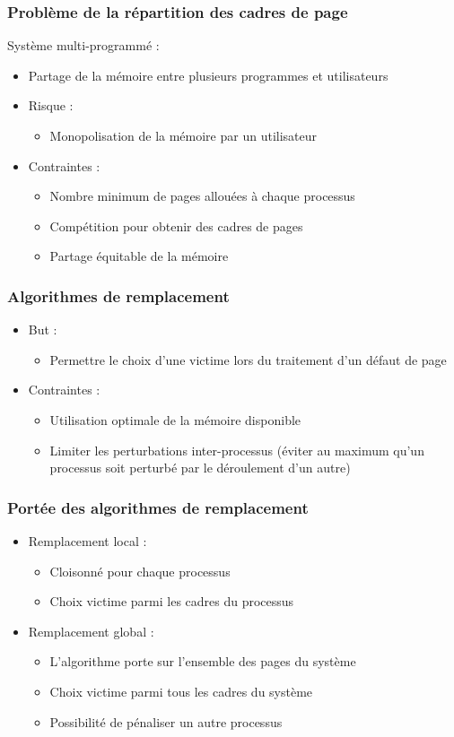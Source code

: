 \begin{frame}
\frametitle{Problème de la répartition des cadres de page}
Système multi-programmé :
\begin{itemize}
\item Partage de la mémoire entre plusieurs programmes et utilisateurs
\item Risque :
\begin{itemize}
\item Monopolisation de la mémoire par un utilisateur
\end{itemize}
\item Contraintes :
\begin{itemize}
\item Nombre minimum de pages allouées à chaque processus
\item Compétition pour obtenir des cadres de pages
\item Partage équitable de la mémoire
\end{itemize}
\end{itemize}
\end{frame}


\begin{frame}
\frametitle{Algorithmes de remplacement}
\begin{itemize}
\item But :
\begin{itemize}
\item Permettre le choix d'une victime lors du traitement d'un défaut de page
\end{itemize}
\item Contraintes :
\begin{itemize}
\item Utilisation optimale de la mémoire disponible
\item Limiter les perturbations inter-processus (éviter au maximum qu'un processus soit perturbé par le déroulement d'un autre)
\end{itemize}
\end{itemize}
\end{frame}


\begin{frame}
\frametitle{Portée des algorithmes de remplacement}
\begin{itemize}
\item Remplacement local :
\begin{itemize}
\item Cloisonné pour chaque processus
\item Choix victime parmi les cadres du processus
\end{itemize}
\item Remplacement global :
\begin{itemize}
\item L'algorithme porte sur l'ensemble des pages du système
\item Choix victime parmi tous les cadres du système
\item Possibilité de pénaliser un autre processus
\end{itemize}
\end{itemize}
\end{frame}



